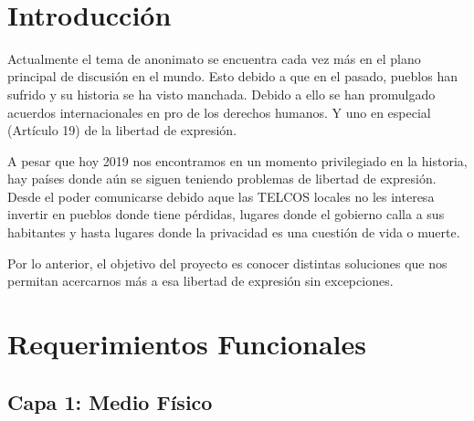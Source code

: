 \documentclass{article}
\begin{document}
\begin{adjustwidth}{9cm}{}
~\vfill

\section{Introducción}\label{introducciuxf3n}
\large
Actualmente el tema de anonimato se encuentra cada vez más en el plano
principal de discusión en el mundo. Esto debido a que en el pasado,
pueblos han sufrido y su historia se ha visto manchada. Debido a ello se
han promulgado acuerdos internacionales en pro de los derechos humanos.
Y uno en especial (Artículo 19) de la libertad de expresión.

A pesar que hoy 2019 nos encontramos en un momento privilegiado en la
historia, hay países donde aún se siguen teniendo problemas de libertad
de expresión. Desde el poder comunicarse debido aque las TELCOS locales
no les interesa invertir en pueblos donde tiene pérdidas, lugares donde
el gobierno calla a sus habitantes y hasta lugares donde la privacidad
es una cuestión de vida o muerte.

Por lo anterior, el objetivo del proyecto es conocer distintas
soluciones que nos permitan acercarnos más a esa libertad de expresión
sin excepciones.

\vspace{2cm}

\end{adjustwidth}


\newpage

\section{Requerimientos Funcionales}\label{requerimientos-funcionales}

\subsection{Capa 1: Medio Físico}\label{capa-1-medio-fuxedsico}
\end{document}
